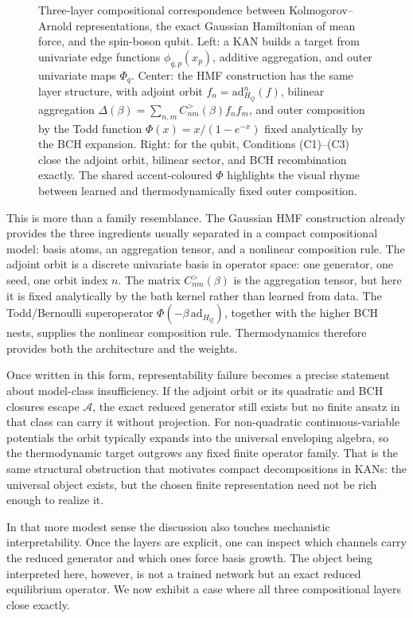 \begin{figure}[t]
    \centering
    \resizebox{0.96\textwidth}{!}{}
    \caption{Three-layer compositional correspondence between
    Kolmogorov--Arnold representations, the exact Gaussian Hamiltonian of mean
    force, and the spin-boson qubit. Left: a KAN builds a target from
    univariate edge functions $\phi_{q,p}(x_p)$, additive aggregation, and
    outer univariate maps $\Phi_q$. Center: the HMF construction has the same
    layer structure, with adjoint orbit
    $f_n=\mathrm{ad}_{H_Q}^n(f)$, bilinear aggregation
    $\Delta(\beta)=\sum_{n,m} C^>_{nm}(\beta)f_n f_m$, and outer composition by
    the Todd function $\Phi(x)=x/(1-e^{-x})$ fixed analytically by the BCH
    expansion. Right: for the qubit, Conditions (C1)--(C3) close the adjoint
    orbit, bilinear sector, and BCH recombination exactly. The shared
    accent-coloured $\Phi$ highlights the visual rhyme between learned and
    thermodynamically fixed outer composition.}
    \label{fig:kan_hmf_closure}
\end{figure}

This is more than a family resemblance. The Gaussian HMF construction already
provides the three ingredients usually separated in a compact compositional
model: basis atoms, an aggregation tensor, and a nonlinear composition rule.
The adjoint orbit is a discrete univariate basis in operator space: one
generator, one seed, one orbit index $n$. The matrix $C^>_{nm}(\beta)$ is the
aggregation tensor, but here it is fixed analytically by the bath kernel rather
than learned from data. The Todd/Bernoulli superoperator
\(\Phi(-\beta\,\mathrm{ad}_{H_Q})\), together with the higher BCH nests,
supplies the nonlinear composition rule. Thermodynamics therefore provides both
the architecture and the weights.

Once written in this form, representability failure becomes a precise statement
about model-class insufficiency. If the adjoint orbit or its quadratic and BCH
closures escape $\mathcal A$, the exact reduced generator still exists but no
finite ansatz in that class can carry it without projection. For non-quadratic
continuous-variable potentials the orbit typically expands into the universal
enveloping algebra, so the thermodynamic target outgrows any fixed finite
operator family. That is the same structural obstruction that motivates compact
decompositions in KANs: the universal object exists, but the chosen finite
representation need not be rich enough to realize it.

In that more modest sense the discussion also touches mechanistic
interpretability. Once the layers are explicit, one can inspect which channels
carry the reduced generator and which ones force basis growth. The object being
interpreted here, however, is not a trained network but an exact reduced
equilibrium operator. We now exhibit a case where all three compositional
layers close exactly.
